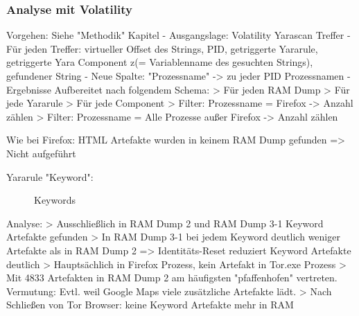 \subsubsection*{Analyse mit Volatility}
Vorgehen: Siehe "Methodik" Kapitel
	- Ausgangslage: Volatility Yarascan Treffer
	- Für jeden Treffer: virtueller Offset des Strings, PID, getriggerte Yararule, getriggerte Yara Component z(= Variablenname des gesuchten Strings), gefundener String
	- Neue Spalte: "Prozessname" -> zu jeder PID Prozessnamen
	- Ergebnisse Aufbereitet nach folgendem Schema:
		> Für jeden RAM Dump
		> Für jede Yararule
		> Für jede Component
		> Filter: Prozessname = Firefox -> Anzahl zählen
		> Filter: Prozessname = Alle Prozesse außer Firefox -> Anzahl zählen

Wie bei Firefox: HTML Artefakte wurden in keinem RAM Dump gefunden => Nicht aufgeführt

Yararule "Keyword":
	\begin{figure}[h!]
		\centerline{}
		\label{chart:final-criteria}  
		\caption{Keywords}
	\end{figure}
	Analyse:
		> Ausschließlich in RAM Dump 2 und RAM Dump 3-1 Keyword Artefakte gefunden
		> In RAM Dump 3-1 bei jedem Keyword deutlich weniger Artefakte als in RAM Dump 2 => Identitäts-Reset reduziert Keyword Artefakte deutlich
		> Hauptsächlich in Firefox Prozess, kein Artefakt in Tor.exe Prozess
		> Mit 4833 Artefakten in RAM Dump 2 am häufigsten "pfaffenhofen" vertreten. Vermutung: Evtl. weil Google Maps viele zusätzliche Artefakte lädt. 
		> Nach Schließen von Tor Browser: keine Keyword Artefakte mehr in RAM
		
